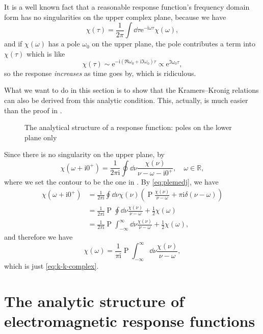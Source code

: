 \documentclass[hyperref, a4paper]{article}
\DeclareMathOperator{\primevalue}{P}
\newcommand*{\ii}{\mathrm{i}}
\newcommand*{\ee}{\mathrm{e}}
\begin{document}
It is a well known fact that a reasonable response function's frequency domain form has no singularities on the upper complex plane, because we have 
\[
    \chi(\tau) = \frac{1}{2\pi} \int \dd{\tau} \ee^{- \ii \omega \tau} \chi(\omega),
\]
and if $\chi(\omega)$ has a pole $\omega_0$ on the upper plane, the pole contributes a term into $\chi(\tau)$ which is like 
\[
    \chi(\tau) \sim \ee^{- \ii (\Re \omega_0 + \ii \Im \omega_0) \tau} \propto \ee^{\Im \omega_0 \tau},
\]
so the response \emph{increases} as time goes by, which is ridiculous.

What we want to do in this section is to show that the Kramers–Kronig relations can also be derived from this analytic condition.
This, actually, is much easier than the proof in .

\begin{figure}
    \centering
    
    \caption{The analytical structure of a response function: poles on the lower plane only}
    \label{fig:lower-only}
\end{figure}

Since there is no singularity on the upper plane, by 
\[
    \chi(\omega + \ii 0^+) = \frac{1}{2 \pi \ii} \oint \dd{\nu} \frac{\chi(\nu)}{\nu - \omega - \ii 0^+} , \quad \omega \in \mathbb{R},
\]
where we set the contour to be the one in . By \eqref{eq:plemedj}, we have 
\[
    \begin{aligned}
        \chi(\omega + \ii 0^+) &= \frac{1}{2 \pi \ii} \oint \dd{\nu} \chi(\nu) \left( \primevalue \frac{\chi(\nu)}{\nu - \omega } + \pi \ii \delta(\nu - \omega) \right) \\
        &= \frac{1}{2 \pi \ii} \primevalue \oint \dd{\nu} \frac{\chi(\nu)}{\nu - \omega} + \frac{1}{2} \chi(\omega) \\
        &= \frac{1}{2 \pi \ii} \primevalue \int_{-\infty}^\infty \dd{\nu} \frac{\chi(\nu)}{\nu - \omega} + \frac{1}{2} \chi(\omega),
    \end{aligned}
\]
and therefore we have 
\begin{equation}
    \chi(\omega) = \frac{1}{ \pi \ii} \primevalue \int_{-\infty}^\infty \dd{\nu} \frac{\chi(\nu)}{\nu - \omega},
\end{equation}
which is just \eqref{eq:k-k-complex}.

\section{The analytic structure of electromagnetic response functions}
\end{document}
